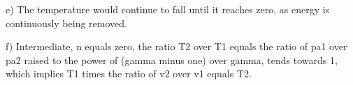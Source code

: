 e) The temperature would continue to fall until it reaches zero, as energy is continuously being removed.

f) Intermediate, n equals zero, the ratio T2 over T1 equals the ratio of pa1 over pa2 raised to the power of (gamma minus one) over gamma, tends towards 1, which implies T1 times the ratio of v2 over v1 equals T2.